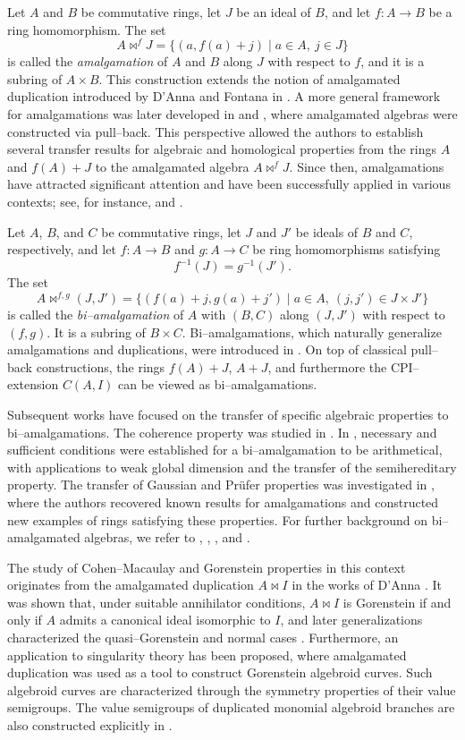 \documentclass{amsart}%
\theoremstyle{plain}
\numberwithin{equation}{section}
\theoremstyle{definition}
\begin{document}
Let $A$ and $B$ be commutative rings, let $J$ be an ideal of $B$, and let $f\colon A \to B$ be a ring homomorphism. The set
\[
A \bowtie^{f} J = \{(a, f(a)+j) \mid a \in A,\ j \in J\}
\]
is called the \emph{amalgamation} of $A$ and $B$ along $J$ with respect to $f$, and it is a subring of $A \times B$. This construction extends the notion of amalgamated duplication introduced by D'Anna and Fontana in \cite{DF}. A more general framework for amalgamations was later developed in \cite{DFF} and \cite{DFF2}, where amalgamated algebras were constructed via pull--back. This perspective allowed the authors to establish several transfer results for algebraic and homological properties from the rings $A$ and $f(A)+J$ to the amalgamated algebra $A \bowtie^{f} J$. Since then, amalgamations have attracted significant attention and have been successfully applied in various contexts; see, for instance, \cite{DMZ} and \cite{MMZ2}. \medskip

Let $A$, $B$, and $C$ be commutative rings, let $J$ and $J'$ be ideals of $B$ and $C$, respectively, and let $f\colon A \to B$ and $g\colon A \to C$ be ring homomorphisms satisfying
\[
f^{-1}(J)=g^{-1}(J').
\]
The set
\[
A \bowtie^{f,g}(J,J')=\{(f(a)+j, g(a)+j') \mid a\in A,\ (j,j')\in J\times J'\}
\]
is called the \emph{bi--amalgamation} of $A$ with $(B,C)$ along $(J,J')$ with respect to $(f,g)$. It is a subring of $B \times C$. Bi--amalgamations, which naturally generalize amalgamations and duplications, were introduced in \cite{KLT}. On top of classical pull--back constructions, the rings $f(A)+J$, $A+J$, and furthermore the CPI--extension $C(A,I)$ can be viewed as bi--amalgamations. \medskip

Subsequent works have focused on the transfer of specific algebraic properties to bi--amalgamations. The coherence property was studied in \cite{OM}. In \cite{KMM}, necessary and sufficient conditions were established for a bi--amalgamation to be arithmetical, with applications to weak global dimension and the transfer of the semihereditary property. The transfer of Gaussian and Pr\"ufer properties was investigated in \cite{MM}, where the authors recovered known results for amalgamations and constructed new examples of rings satisfying these properties. For further background on bi--amalgamated algebras, we refer to \cite{OM}, \cite{KLT}, \cite{KMM}, and \cite{MM}. \medskip

The study of Cohen--Macaulay and Gorenstein properties in this context originates from the amalgamated duplication $A \bowtie I$ in the works of D'Anna \cite{Gorenstein}. It was shown that, under suitable annihilator conditions, $A \bowtie I$ is Gorenstein if and only if $A$ admits a canonical ideal isomorphic to $I$, and later generalizations characterized the quasi--Gorenstein and normal cases \cite{quasigorenstein,SS}. Furthermore, an application to singularity theory has been proposed, where amalgamated duplication was used as a tool to construct Gorenstein algebroid curves. Such algebroid curves are characterized through the symmetry properties of their value semigroups. The value semigroups of duplicated monomial algebroid branches are also constructed explicitly in \cite{Gorenstein}.\medskip
\end{document}
